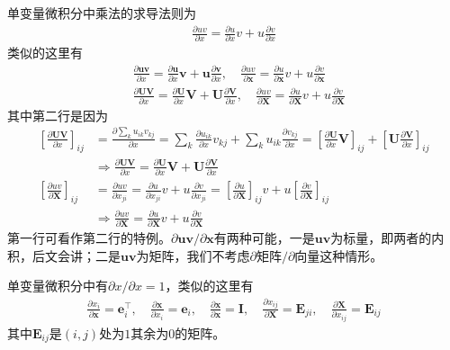 \documentclass{ctexart}
\newcommand{\blue}[1]{\textcolor{Solarized-blue}{#1}}
\theoremstyle{definition}
\def \ev {\bm{e}}
\def \uv {\bm{u}}
\def \vv {\bm{v}}
\def \xv {\bm{x}}
\def \Ev {\mathbf{E}}
\def \Iv {\mathbf{I}}
\def \Uv {\mathbf{U}}
\def \Vv {\mathbf{V}}
\def \Xv {\mathbf{X}}
\begin{document}
单变量微积分中\blue{乘法}的求导法则为
\begin{align*}
    \frac{\partial uv}{\partial x} = \frac{\partial u}{\partial x} v + u \frac{\partial v}{\partial x}
\end{align*}
类似的这里有
\begin{align*}
     & \frac{\partial \uv \vv}{\partial x} = \frac{\partial \uv}{\partial x} \vv + \uv \frac{\partial \vv}{\partial x}, \quad \frac{\partial uv}{\partial \xv} = \frac{\partial u}{\partial \xv} v + u \frac{\partial v}{\partial \xv} \\
     & \frac{\partial \Uv \Vv}{\partial x} = \frac{\partial \Uv}{\partial x} \Vv + \Uv \frac{\partial \Vv}{\partial x}, \quad \frac{\partial uv}{\partial \Xv} = \frac{\partial u}{\partial \Xv} v + u \frac{\partial v}{\partial \Xv}
\end{align*}
其中第二行是因为
\begin{align*}
    \left[ \frac{\partial \Uv \Vv}{\partial x} \right]_{ij} & = \frac{\partial \sum_k u_{ik} v_{kj}}{\partial x} = \sum_k \frac{\partial u_{ik}}{\partial x} v_{kj} + \sum_k u_{ik} \frac{\partial v_{kj}}{\partial x} = \left[ \frac{\partial \Uv}{\partial x} \Vv \right]_{ij} + \left[ \Uv \frac{\partial \Vv}{\partial x} \right]_{ij} \\
                                                            & \Longrightarrow \frac{\partial \Uv \Vv}{\partial x} = \frac{\partial \Uv}{\partial x} \Vv + \Uv \frac{\partial \Vv}{\partial x}                                                                                                                                              \\
    \left[ \frac{\partial uv}{\partial \Xv} \right]_{ij}    & = \frac{\partial uv}{\partial x_{ji}} = \frac{\partial u}{\partial x_{ji}} v + u \frac{\partial v}{\partial x_{ji}} = \left[ \frac{\partial u}{\partial \Xv} \right]_{ij} v + u \left[ \frac{\partial v}{\partial \Xv} \right]_{ij}                                          \\
                                                            & \Longrightarrow \frac{\partial uv}{\partial \Xv} = \frac{\partial u}{\partial \Xv} v + u \frac{\partial v}{\partial \Xv}
\end{align*}
第一行可看作第二行的特例。$\partial \uv \vv / \partial \xv$有两种可能，一是$\uv \vv$为标量，即两者的内积，后文会讲；二是$\uv \vv$为矩阵，我们不考虑$\partial 矩阵 / \partial 向量$这种情形。

单变量微积分中有$\partial x / \partial x = 1$，类似的这里有
\begin{align*}
    \frac{\partial x_i}{\partial \xv} = \ev_i^\top, \quad \frac{\partial \xv}{\partial x_i} = \ev_i, \quad \frac{\partial \xv}{\partial \xv} = \Iv, \quad \frac{\partial x_{ij}}{\partial \Xv} = \Ev_{ji}, \quad \frac{\partial \Xv}{\partial x_{ij}} = \Ev_{ij}
\end{align*}
其中$\Ev_{ij}$是$(i,j)$处为$1$其余为$0$的矩阵。
\end{document}
